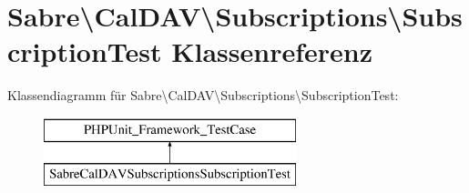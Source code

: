 \hypertarget{class_sabre_1_1_cal_d_a_v_1_1_subscriptions_1_1_subscription_test}{}\section{Sabre\textbackslash{}Cal\+D\+AV\textbackslash{}Subscriptions\textbackslash{}Subscription\+Test Klassenreferenz}
\label{class_sabre_1_1_cal_d_a_v_1_1_subscriptions_1_1_subscription_test}
Klassendiagramm für Sabre\textbackslash{}Cal\+D\+AV\textbackslash{}Subscriptions\textbackslash{}Subscription\+Test\+:\begin{figure}[H]
\begin{center}
\leavevmode
\includegraphics[height=2.000000cm]{class_sabre_1_1_cal_d_a_v_1_1_subscriptions_1_1_subscription_test}
\end{center}
\end{figure}
